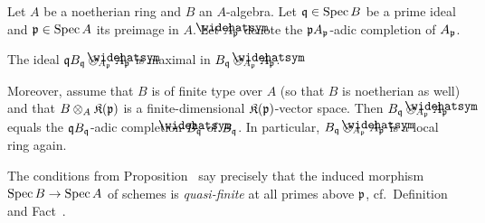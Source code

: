 \documentclass[a4paper,parskip=half,numbers=enddot, DIV=12]{scrreprt}
\begin{document}
\begin{prop}
	Let $A$ be a noetherian ring and $B$ an $A$-algebra. Let $\mathfrak{q}\in\operatorname{Spec} B$ be a prime ideal and $\mathfrak{p}\in\operatorname{Spec} A$ its preimage in $A$. Let $\roof{A}_\pp$ denote the $\mathfrak{p} A_{\mathfrak{p}}$-adic completion of $A_{\mathfrak{p}}$.
	\begin{alphanumerate}
		\item The ideal $\qq B_\qq\otimes_{A_\pp}\roof{A}_\pp$ is maximal in $B_\qq\otimes_{A_\pp}\roof{A}_\pp$.
		\item Moreover, assume that $B$ is of finite type over $A$ (so that $B$ is noetherian as well) and that $B\otimes_A\mathfrak{K}(\mathfrak{p})$ is a finite-dimensional $\mathfrak{K}(\mathfrak{p})$-vector space. Then $B_\qq\otimes_{A_\pp}\roof{A}_\pp$ equals the $\mathfrak{q} B_{\mathfrak{q}}$-adic completion $\roof{B}_\qq$ of $B_{\mathfrak{q}}$. In particular, $B_\qq\otimes_{A_\pp}\roof{A}_\pp$ is a local ring again.
	\end{alphanumerate}
\end{prop}
\begin{rem}
	The conditions from Proposition~ say precisely that the induced morphism $\Spec B\morphism\Spec A$ of schemes is \emph{quasi-finite} at all primes above $\mathfrak{p}$, cf.\ Definition~ and Fact~.
\end{rem}
\end{document}
